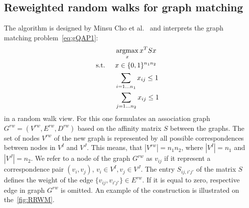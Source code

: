 \subsection{Reweighted random walks for graph matching}
The algorithm is designed by Minsu Cho et al.~\cite{Cho2010_RRWM} and interprets the graph matching problem~\eqref{eq:gQAP1}:
\begin{alignat*}{2}
    &     && \mathop{\rm argmax}_x{x^TSx}                           \notag\\
    & \text{s.t. } &&  x\in \{0,1\}^{n_1n_2}            \notag\\
    &             &&  \sum_{i=1\dots n_1} x_{ij}\le 1   \notag\\
    &             &&  \sum_{j=1\dots n_2} x_{ij}\le 1   \notag
\end{alignat*}
in a random walk view. For this one formulates an association graph $G^{rw}=(V^{rw},E^{rw},D^{rw})$ based on the affinity matrix $S$ between the graphs. The set of nodes $V^{rw}$ of the new graph is represented by all possible correspondences between nodes in $V^I$ and $V^J$. This means, that $|V^{rw}|=n_1n_2$, where $|V^I|=n_1$ and $|V^J|=n_2$. We refer to a node of the graph $G^{rw}$ as $v_{ij}$ if it represent a correspondence pair $(v_i,v_j)$, $v_i\in V^I,v_j\in V^J$. The entry $S_{ij,i'j'}$ of the matrix $S$ defines the weight of the edge $\{v_{ij},v_{i'j'}\}\in E^{rw}$. If it is equal to zero, respective edge in graph $G^{rw}$ is omitted. An example of the construction is illustrated on the~\ref{fig:RRWM}.
